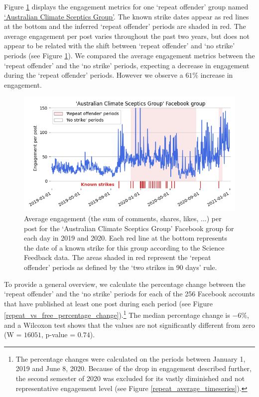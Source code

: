 \documentclass[review]{elsarticle}
\begin{document}
Figure \ref{repeat_example_timeseries} displays the engagement metrics for one `repeat offender' group named \href{https://www.facebook.com/groups/108655705888371/}{`Australian Climate Sceptics Group'}. 
The known strike dates appear as red lines at the bottom and the inferred ‘repeat offender’ periods are shaded in red. 
The average engagement per post varies throughout the past two years, but does not appear to be related with the shift between `repeat offender' and `no strike' periods (see Figure \ref{repeat_example_timeseries}).
We compared the average engagement metrics between the `repeat offender' and the `no strike' periods, expecting a decrease in engagement during the `repeat offender' periods. 
However we observe a $61\%$ increase in engagement.

\begin{figure}[!h]
\centering
\includegraphics[scale=0.5]{./../figure/sf_example_timeseries.png}
\caption{
Average engagement (the sum of comments, shares, likes, ...) per post for the `Australian Climate Sceptics Group' Facebook group for each day in 2019 and 2020.
Each red line at the bottom represents the date of a known strike for this group according to the Science Feedback data. 
The areas shaded in red represent the `repeat offender' periods as defined by the ‘two strikes in 90 days’ rule.
}
\label{repeat_example_timeseries}
\end{figure}

To provide a general overview, we calculate the percentage change between the `repeat offender' and the `no strike' periods for each of the 256 Facebook accounts that have published at least one post during each period (see Figure \ref{repeat_vs_free_percentage_change}).\footnote{The percentage changes were calculated on the periods between January 1, 2019 and June 8, 2020. Because of the drop in engagement described further, the second semester of 2020 was excluded for its vastly diminished and not representative engagement level (see Figure \ref{repeat_average_timeseries}).}
The median percentage change is $-6\%$, and a Wilcoxon test shows that the values are not significantly different from zero (W = $16051$, p-value = $0.74$).
\end{document}
